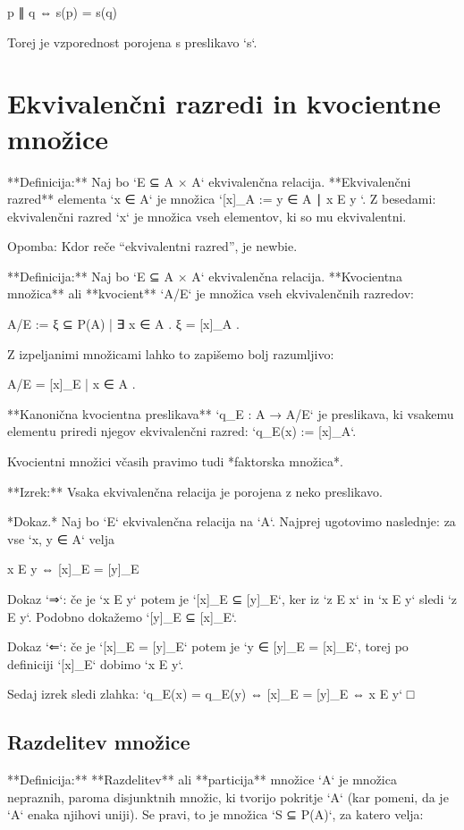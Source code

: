     p ∥ q ⇔ s(p) = s(q)

Torej je vzporednost porojena s preslikavo `s`.


\section{Ekvivalenčni razredi in kvocientne množice}

**Definicija:** Naj bo `E ⊆ A × A` ekvivalenčna relacija. **Ekvivalenčni razred** elementa
`x ∈ A` je množica `[x]_A := { y ∈ A ∣ x E y }`. Z besedami: ekvivalenčni razred `x` je
množica vseh elementov, ki so mu ekvivalentni.

Opomba: Kdor reče “ekvivalentni razred”, je newbie.

**Definicija:** Naj bo `E ⊆ A × A` ekvivalenčna relacija. **Kvocientna množica** ali
**kvocient** `A/E` je množica vseh ekvivalenčnih razredov:

    A/E := { ξ ⊆ P(A) | ∃ x ∈ A . ξ = [x]_A }.

Z izpeljanimi množicami lahko to zapišemo bolj razumljivo:

    A/E = { [x]_E | x ∈ A }.


**Kanonična kvocientna preslikava** `q_E : A → A/E` je preslikava, ki vsakemu elementu
priredi njegov ekvivalenčni razred: `q_E(x) := [x]_A`.

Kvocientni množici včasih pravimo tudi *faktorska množica*.


**Izrek:** Vsaka ekvivalenčna relacija je porojena z neko preslikavo.

*Dokaz.* Naj bo `E` ekvivalenčna relacija na `A`. Najprej ugotovimo naslednje: za vse `x,
y ∈ A` velja

    x E y ⇔ [x]_E = [y]_E

Dokaz `⇒`: če je `x E y` potem je `[x]_E ⊆ [y]_E`, ker iz `z E x` in `x E y` sledi `z E y`.
Podobno dokažemo `[y]_E ⊆ [x]_E`.

Dokaz `⇐`: če je `[x]_E = [y]_E` potem je `y ∈ [y]_E = [x]_E`, torej po definiciji `[x]_E`
dobimo `x E y`.

Sedaj izrek sledi zlahka: `q_E(x) = q_E(y) ⇔ [x]_E = [y]_E ⇔ x E y` □


\subsection{Razdelitev množice}

**Definicija:** **Razdelitev** ali **particija** množice `A` je množica nepraznih, paroma
disjunktnih množic, ki tvorijo pokritje `A` (kar pomeni, da je `A` enaka njihovi uniji). Se
pravi, to je množica `S ⊆ P(A)`, za katero velja:

